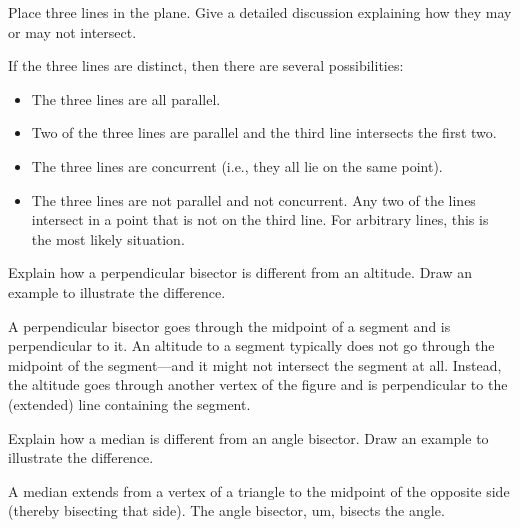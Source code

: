 \documentclass[nooutcomes]{ximera}
\begin{document}
\begin{problem}
Place three lines in the plane. Give a detailed discussion explaining
  how they may or may not intersect.
\begin{freeResponse}
\begin{hint}
If the three lines are distinct, then there are several possibilities: 
\begin{itemize}
\item The three lines are all parallel. 
\item Two of the three lines are parallel and the third line intersects the first two. 
\item The three lines are concurrent (i.e., they all lie on the same point).
\item The three lines are not parallel and not concurrent.  Any two of the lines intersect in a point that is not on the third line.  For arbitrary lines, this is the most likely situation. 
\end{itemize}
\end{hint}
\end{freeResponse}
\end{problem}

\begin{problem}
Explain how a perpendicular bisector is different from an
  altitude. Draw an example to illustrate the difference.
\begin{freeResponse}
\begin{hint}
A perpendicular bisector goes through the midpoint of a segment and is perpendicular to it.  An altitude to a segment typically does not go through the midpoint of the segment---and it might not intersect the segment at all.  Instead, the altitude goes through another vertex of the figure and is perpendicular to the (extended) line containing the segment.    
\end{hint}
\end{freeResponse}
\end{problem}

\begin{problem}
Explain how a median is different from an angle bisector.  Draw an
  example to illustrate the difference.
\begin{freeResponse}
\begin{hint}
A median extends from a vertex of a triangle to the midpoint of the opposite side (thereby bisecting that side).  The angle bisector, um, bisects the angle.
\end{hint}
\end{freeResponse}
\end{problem}
\end{document}
